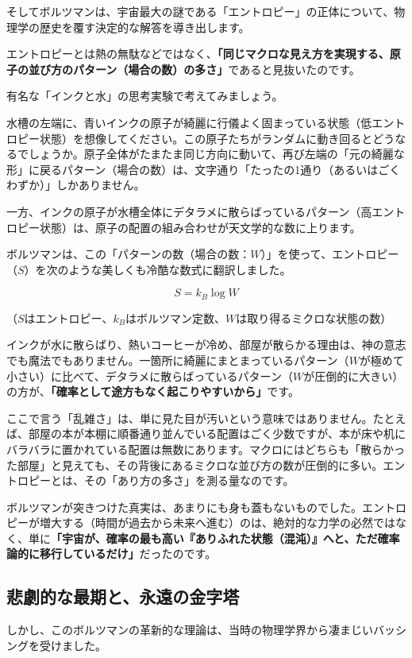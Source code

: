 そしてボルツマンは、宇宙最大の謎である「エントロピー」の正体について、物理学の歴史を覆す決定的な解答を導き出します。

エントロピーとは熱の無駄などではなく、\textbf{「同じマクロな見え方を実現する、原子の並び方のパターン（場合の数）の多さ」}であると見抜いたのです。

有名な「インクと水」の思考実験で考えてみましょう。

水槽の左端に、青いインクの原子が綺麗に行儀よく固まっている状態（低エントロピー状態）を想像してください。この原子たちがランダムに動き回るとどうなるでしょうか。原子全体がたまたま同じ方向に動いて、再び左端の「元の綺麗な形」に戻るパターン（場合の数）は、文字通り「たったの1通り（あるいはごくわずか）」しかありません。

一方、インクの原子が水槽全体にデタラメに散らばっているパターン（高エントロピー状態）は、原子の配置の組み合わせが天文学的な数に上ります。

ボルツマンは、この「パターンの数（場合の数：\(W\)）」を使って、エントロピー（\(S\)）を次のような美しくも冷酷な数式に翻訳しました。

\[
S=k_B\log W
\]

（\(S\)はエントロピー、\(k_B\)はボルツマン定数、\(W\)は取り得るミクロな状態の数）

インクが水に散らばり、熱いコーヒーが冷め、部屋が散らかる理由は、神の意志でも魔法でもありません。一箇所に綺麗にまとまっているパターン（\(W\)が極めて小さい）に比べて、デタラメに散らばっているパターン（\(W\)が圧倒的に大きい）の方が、\textbf{「確率として途方もなく起こりやすいから」}です。

ここで言う「乱雑さ」は、単に見た目が汚いという意味ではありません。たとえば、部屋の本が本棚に順番通り並んでいる配置はごく少数ですが、本が床や机にバラバラに置かれている配置は無数にあります。マクロにはどちらも「散らかった部屋」と見えても、その背後にあるミクロな並び方の数が圧倒的に多い。エントロピーとは、その「あり方の多さ」を測る量なのです。

ボルツマンが突きつけた真実は、あまりにも身も蓋もないものでした。エントロピーが増大する（時間が過去から未来へ進む）のは、絶対的な力学の必然ではなく、単に\textbf{「宇宙が、確率の最も高い『ありふれた状態（混沌）』へと、ただ確率論的に移行しているだけ」}だったのです。

\subsection{悲劇的な最期と、永遠の金字塔}

しかし、このボルツマンの革新的な理論は、当時の物理学界から凄まじいバッシングを受けました。

